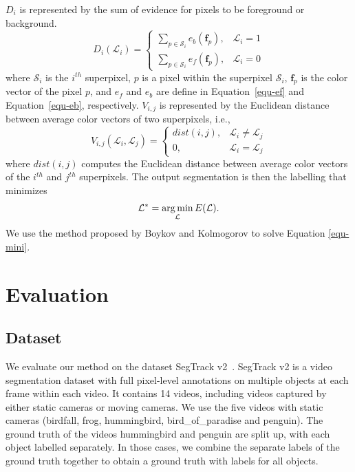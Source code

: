 $D_{i}$ is represented by the sum of evidence for pixels to be foreground or background.
\begin{equation}
	D_{i}(\mathcal{L}_{i})=
	\begin{cases}
		\sum_{p\in\mathcal{S}_{i}}e_{b}(\mathbf{f}_{p}), & \mathcal{L}_{i}=1\\
		\sum_{p\in\mathcal{S}_{i}}e_{f}(\mathbf{f}_{p}), & \mathcal{L}_{i}=0
	\end{cases}
\end{equation}
where $\mathcal{S}_{i}$ is the $i^{th}$ superpixel, $p$ is a pixel within the superpixel $\mathcal{S}_{i}$, $\mathbf{f}_{p}$ is the color vector of the pixel $p$, and $e_{f}$ and $e_{b}$ are define in Equation~\ref{equ-ef} and Equation~\ref{equ-eb}, respectively. $V_{i,j}$ is represented by the Euclidean distance between average color vectors of two superpixels, i.e.,
\begin{equation}
	V_{i,j}(\mathcal{L}_{i},\mathcal{L}_{j})=
	\begin{cases}
		dist(i,j), & \mathcal{L}_{i}\neq\mathcal{L}_{j}\\
		0, & \mathcal{L}_{i}=\mathcal{L}_{j}
	\end{cases}
\end{equation}
where $dist(i,j)$ computes the Euclidean distance between average color vectors of the $i^{th}$ and $j^{th}$ superpixels. The output segmentation is then the labelling that minimizes
\begin{equation}
	\label{equ-mini}
	\mathcal{L}^{*}=\operatorname*{arg\,min}_{\mathcal{L}}E(\mathcal{L}).
\end{equation}
We use the method proposed by Boykov and Kolmogorov \cite{boykov2004} to solve Equation \ref{equ-mini}.

\section{Evaluation}
\label{sec:vos:e}

\subsection{Dataset}
\label{sec:vos:e:ds}

We evaluate our method on the dataset SegTrack v2~\cite{f-li2013}. SegTrack v2 is a video segmentation dataset with full pixel-level annotations on multiple objects at each frame within each video.
It contains 14 videos, including videos captured by either static cameras or moving cameras. We use the five videos with static cameras (birdfall, frog, hummingbird, bird\_of\_paradise and penguin).
The ground truth of the videos hummingbird and penguin are split up, with each object labelled separately. In those cases, we combine the separate labels of the ground truth together to obtain a ground truth with labels for all objects.

